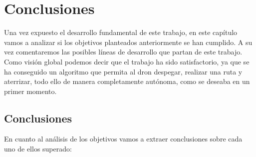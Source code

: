 \chapter{Conclusiones}\label{cap.conclusiones}
\hspace{1cm} Una vez expuesto el desarrollo fundamental de este trabajo, en este capítulo vamos a analizar si los objetivos planteados anteriormente se han cumplido. A su vez comentaremos las posibles líneas de desarrollo que partan de este trabajo. Como visión global podemos decir que el trabajo ha sido satisfactorio, ya que se ha conseguido un algoritmo que permita al dron despegar, realizar una ruta y aterrizar, todo ello de manera completamente autónoma, como se deseaba en un primer momento. 

\section{Conclusiones}
\hspace{1cm} En cuanto al análisis de los objetivos vamos a extraer conclusiones sobre cada uno de ellos superado:

